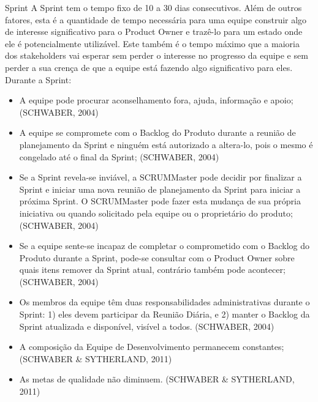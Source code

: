 Sprint
A Sprint tem o tempo fixo de 10 a 30 dias consecutivos. Além de outros fatores, esta é a quantidade de tempo necessária para uma equipe construir algo de interesse significativo para o Product Owner e trazê-lo para um estado onde ele é potencialmente utilizável. Este também é o tempo máximo que a maioria dos stakeholders vai esperar sem perder o interesse no progresso da equipe e sem perder a sua crença de que a equipe está fazendo algo significativo para eles. Durante a Sprint:
\begin{itemize}
	\item A equipe pode procurar aconselhamento fora, ajuda, informação e apoio; (SCHWABER, 2004)
	\item A equipe se compromete com o Backlog do Produto durante a reunião de planejamento da Sprint e ninguém está autorizado a altera-lo, pois o mesmo é congelado até o final da Sprint; (SCHWABER, 2004)
	\item Se a Sprint revela-se inviável, a SCRUMMaster pode decidir por finalizar a Sprint e iniciar uma nova reunião de planejamento da Sprint para iniciar a próxima Sprint. O SCRUMMaster pode fazer esta mudança de sua própria iniciativa ou quando solicitado pela equipe ou o proprietário do produto; (SCHWABER, 2004)
	\item Se a equipe sente-se incapaz de completar o comprometido com o Backlog do Produto durante a Sprint, pode-se consultar com o Product Owner sobre quais itens remover da Sprint atual, contrário também pode acontecer; (SCHWABER, 2004)
	\item Os membros da equipe têm duas responsabilidades administrativas durante o Sprint: 1) eles devem participar da Reunião Diária, e 2) manter o Backlog da Sprint atualizada e disponível, visível a todos. (SCHWABER, 2004)
	\item A composição da Equipe de Desenvolvimento permanecem constantes; (SCHWABER & SYTHERLAND, 2011)
	\item As metas de qualidade não diminuem. (SCHWABER & SYTHERLAND, 2011)
\end{itemize}

